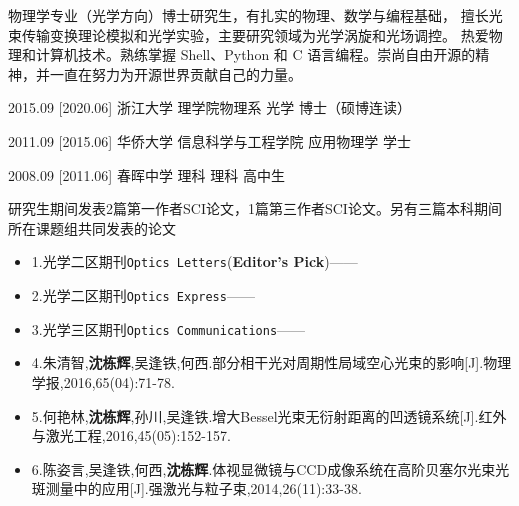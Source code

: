 \documentclass[zh]{resume}
\begin{document}
\makeheader

{\onehalfspacing\hspace{2em}
物理学专业（光学方向）博士研究生，有扎实的物理、数学与编程基础，
擅长光束传输变换理论模拟和光学实验，主要研究领域为光学涡旋和光场调控。
热爱物理和计算机技术。熟练掌握 Shell、Python 和 C 语言编程。崇尚自由开源的精神，并一直在努力为开源世界贡献自己的力量。
\par}


\begin{educations}
  \education%
    {2015.09}%
    [2020.06]%
    {浙江大学}%
    {理学院物理系}%
    {光学}%
    {博士（硕博连读）}

\separator{0.5ex}
\education%
{2011.09}%
[2015.06]%
{华侨大学}%
{信息科学与工程学院}%
{应用物理学}%
{学士}

\separator{0.5ex}
\education%
{2008.09}%
[2011.06]%
{春晖中学}%
{理科}%
{理科}%
{高中生}
\end{educations}

研究生期间发表2篇第一作者SCI论文，1篇第三作者SCI论文。另有三篇本科期间所在课题组共同发表的论文
\begin{itemize}
  \item 1.光学二区期刊\texttt{Optics Letters}(\textbf{Editor's Pick})——
  \item 2.光学二区期刊\texttt{Optics Express}——
  \item 3.光学三区期刊\texttt{Optics Communications}——
  \item 4.朱清智,\textbf{沈栋辉},吴逢铁,何西.部分相干光对周期性局域空心光束的影响[J].物理学报,2016,65(04):71-78.
  \item 5.何艳林,\textbf{沈栋辉},孙川,吴逢铁.增大Bessel光束无衍射距离的凹透镜系统[J].红外与激光工程,2016,45(05):152-157.
  \item 6.陈姿言,吴逢铁,何西,\textbf{沈栋辉}.体视显微镜与CCD成像系统在高阶贝塞尔光束光斑测量中的应用[J].强激光与粒子束,2014,26(11):33-38.
\end{itemize}
\end{document}
